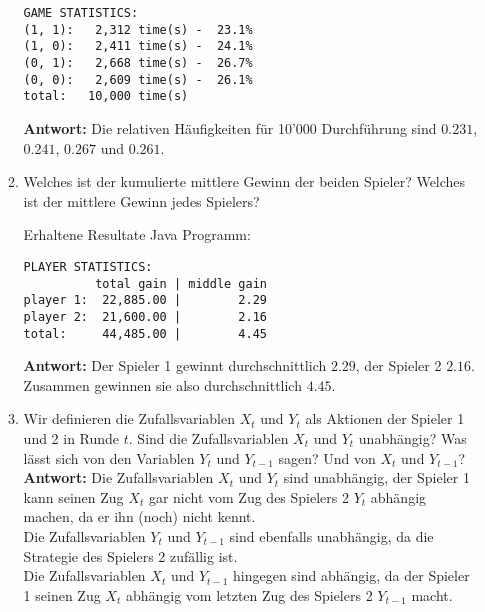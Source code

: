 \documentclass[12pt,a4paper]{article}
\begin{document}
\begin{enumerate}
\begin{enumerate}
\begin{verbatim}
GAME STATISTICS:
(1, 1):   2,312 time(s) -  23.1%
(1, 0):   2,411 time(s) -  24.1%
(0, 1):   2,668 time(s) -  26.7%
(0, 0):   2,609 time(s) -  26.1%
total:   10,000 time(s)
\end{verbatim}
\textbf{Antwort:} Die relativen Häufigkeiten für 10'000 Durchführung sind $0.231$, $0.241$, $0.267$ und $0.261$.

\item Welches ist der kumulierte mittlere Gewinn der beiden Spieler?
Welches ist der mittlere Gewinn jedes Spielers?
\begin{center}Erhaltene Resultate Java Programm:\end{center}
\begin{verbatim}
PLAYER STATISTICS:
          total gain | middle gain
player 1:  22,885.00 |        2.29
player 2:  21,600.00 |        2.16
total:     44,485.00 |        4.45
\end{verbatim}
\textbf{Antwort:} Der Spieler 1 gewinnt durchschnittlich $2.29$, der Spieler 2 $2.16$.
Zusammen gewinnen sie also durchschnittlich $4.45$.
\newpage

\item Wir definieren die Zufallsvariablen $X_t$ und $Y_t$ als Aktionen der Spieler 1 und 2 in Runde $t$.
Sind die Zufallsvariablen $X_t$ und $Y_t$ unabhängig? Was lässt sich von den Variablen $Y_t$ und $Y_{t-1}$ sagen?
Und von $X_t$ und $Y_{t-1}$?\\
\textbf{Antwort:} Die Zufallsvariablen $X_t$ und $Y_t$ sind unabhängig, der Spieler 1 kann seinen Zug $X_t$ gar nicht vom Zug des Spielers 2 $Y_t$ abhängig machen, da er ihn (noch) nicht kennt.\\
Die Zufallsvariablen $Y_t$ und $Y_{t-1}$ sind ebenfalls unabhängig, da die Strategie des Spielers 2 zufällig ist.\\
Die Zufallsvariablen $X_t$ und $Y_{t-1}$ hingegen sind abhängig, da der Spieler 1 seinen Zug $X_t$ abhängig vom letzten Zug des Spielers 2 $Y_{t-1}$ macht.


\end{enumerate}
\end{enumerate}
\end{document}
